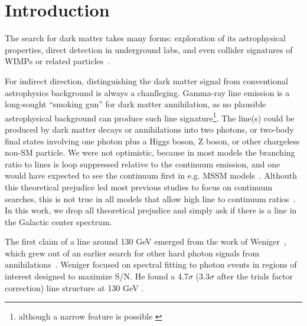 \documentclass[aps,twocolumn,prd,superscriptaddress,showpacs,nofootinbib,fixfloat]{revtex4}
\begin{document}
\maketitle




\section{Introduction}

The search for dark matter takes many forms: exploration of
its astrophysical properties, direct detection in
underground labs, and even collider signatures of WIMPs or
related
particles~\citep{Jungman:1995df,Bergstrom:2000,Bertone:2005,
Hooper:2007Review, 2012arXiv1205.4882B}.

For indirect direction, distinguishing the dark matter
signal from conventional astrophysics background is always a
chanlleging. Gamma-ray line emission is a long-sought
``smoking gun'' for dark matter annihilation, as no
plausible astrophysical background can produce such line
signature\footnote{although a narrow feature is possible
\citep[see][]{2012arXiv1207.0458A}}.  The line(s) could be
produced by dark matter decays or annihilations into two
photons, or two-body final states involving one photon plus
a Higgs boson, Z boson, or other chargeless non-SM
particle. We were not optimistic, because in most models the
branching ratio to lines is loop suppressed relative to the
continuum emission, and one would have expected to see the
continuum first in e.g. MSSM
models~\citep[e.g.][]{Bergstrom:1997}.  Althouth this
theoretical prejudice led most previous studies to focus on
continuum searches, this is not true in all models that
allow high line to continuum
ratios~\citep[e.g.][]{Bergstrom:1998,Bergstrom:2000,Bertone:2009,Jackson:2010,Cline:2012,Weiner:2012}.
In this work, we drop all theoretical prejudice and simply
ask if there is a line in the Galactic center spectrum.

The first claim of a line around 130 GeV emerged from the
work of Weniger~\citep{Weniger:2012}, which grew out of an
earlier search for other hard photon signals from
annihilations~\citep{Bringmann:2012}.  Weniger focused on
spectral fitting to photon events in regions of interest
designed to maximize S/N.  He found a 4.7$\sigma$
(3.3$\sigma$ after the trials factor correction) line
structure at 130 GeV .
\end{document}

